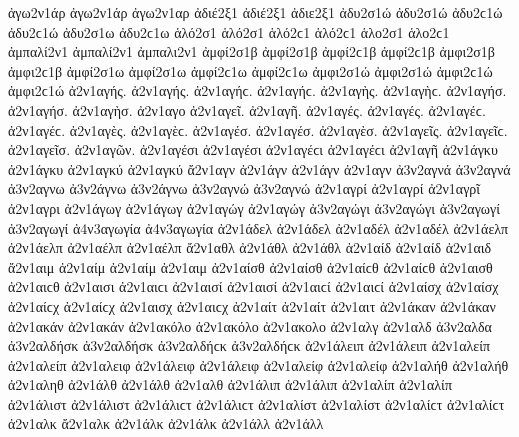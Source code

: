 {%
%
ἀγω2ν1άρ ἀγω2ν1άρ   %
ἀγω2ν1αρ 
ἀδιέ2ξ1 ἀδιέ2ξ1   %
ἀδιε2ξ1 
ἀδυ2σ1ώ ἀδυ2σ1ώ ἀδυ2ϲ1ώ ἀδυ2ϲ1ώ   %
ἀδυ2σ1ω ἀδυ2ϲ1ω 
ἁλό2σ1 ἁλό2σ1 ἁλό2ϲ1 ἁλό2ϲ1   %
ἁλο2σ1 ἁλο2ϲ1 
ἀμπαλί2ν1 ἀμπαλί2ν1   %
ἀμπαλι2ν1 
ἀμφί2σ1β ἀμφί2σ1β ἀμφί2ϲ1β ἀμφί2ϲ1β   %
ἀμφι2σ1β ἀμφι2ϲ1β 
ἀμφί2σ1ω ἀμφί2σ1ω ἀμφί2ϲ1ω ἀμφί2ϲ1ω   %
ἀμφι2σ1ώ ἀμφι2σ1ώ ἀμφι2ϲ1ώ ἀμφι2ϲ1ώ 
ἀ2ν1αγής. ἀ2ν1αγής. ἀ2ν1αγήϲ. ἀ2ν1αγήϲ.   %
ἀ2ν1αγὴς. ἀ2ν1αγὴϲ. 
ἀ2ν1αγήσ. ἀ2ν1αγήσ. 
ἀ2ν1αγὴσ. 
ἀ2ν1αγο 
ἀ2ν1αγεῖ. 
ἀ2ν1αγῆ. 
ἀ2ν1αγές. ἀ2ν1αγές. ἀ2ν1αγέϲ. ἀ2ν1αγέϲ. 
ἀ2ν1αγὲς. ἀ2ν1αγὲϲ. 
ἀ2ν1αγέσ. ἀ2ν1αγέσ. 
ἀ2ν1αγὲσ. 
ἀ2ν1αγεῖς. ἀ2ν1αγεῖϲ. 
ἀ2ν1αγεῖσ. 
ἀ2ν1αγῶν. 
ἀ2ν1αγέσι ἀ2ν1αγέσι ἀ2ν1αγέϲι ἀ2ν1αγέϲι 
ἀ2ν1αγῆ 
ἀ2ν1άγκυ ἀ2ν1άγκυ   %
ἀ2ν1αγκύ ἀ2ν1αγκύ 
ἄ2ν1αγν   %
ἀ2ν1άγν ἀ2ν1άγν 
ἀ2ν1αγν   %
ἀ3ν2αγνά ἀ3ν2αγνά   %
ἀ3ν2αγνω   %
ἀ3ν2άγνω ἀ3ν2άγνω   %
ἀ3ν2αγνώ ἀ3ν2αγνώ 
ἀ2ν1αγρί ἀ2ν1αγρί   %
ἀ2ν1αγρῖ   %
ἀ2ν1αγρι   %
ἀ2ν1άγωγ ἀ2ν1άγωγ   %
ἀ2ν1αγώγ ἀ2ν1αγώγ 
ἀ3ν2αγώγι ἀ3ν2αγώγι   %
ἀ3ν2αγωγί ἀ3ν2αγωγί 
ἀ4ν3αγωγία ἀ4ν3αγωγία   %
ἀ2ν1άδελ ἀ2ν1άδελ   %
ἀ2ν1αδέλ ἀ2ν1αδέλ 
ἀ2ν1άελπ ἀ2ν1άελπ   %
ἀ2ν1αέλπ ἀ2ν1αέλπ 
ἄ2ν1αθλ   %
ἀ2ν1άθλ ἀ2ν1άθλ 
ἀ2ν1αίδ ἀ2ν1αίδ   %
ἀ2ν1αιδ   %
ἄ2ν1αιμ   %
ἀ2ν1αίμ ἀ2ν1αίμ 
ἀ2ν1αιμ   %
ἀ2ν1αίσθ ἀ2ν1αίσθ ἀ2ν1αίϲθ ἀ2ν1αίϲθ   %
ἀ2ν1αισθ ἀ2ν1αιϲθ 
ἀ2ν1αισι ἀ2ν1αιϲι   %
ἀ2ν1αισί ἀ2ν1αισί ἀ2ν1αιϲί ἀ2ν1αιϲί 
ἀ2ν1αίσχ ἀ2ν1αίσχ ἀ2ν1αίϲχ ἀ2ν1αίϲχ   %
ἀ2ν1αισχ ἀ2ν1αιϲχ 
ἀ2ν1αίτ ἀ2ν1αίτ   %
ἀ2ν1αιτ 
ἀ2ν1άκαν ἀ2ν1άκαν   %
ἀ2ν1ακάν ἀ2ν1ακάν 
ἀ2ν1ακόλο ἀ2ν1ακόλο   %
ἀ2ν1ακολο 
ἀ2ν1αλγ   %
ἀ2ν1αλδ   %
ἀ3ν2αλδα   %
ἀ3ν2αλδήσκ ἀ3ν2αλδήσκ ἀ3ν2αλδήϲκ ἀ3ν2αλδήϲκ   %
ἀ2ν1άλειπ ἀ2ν1άλειπ   %
ἀ2ν1αλείπ ἀ2ν1αλείπ 
ἀ2ν1αλειφ   %
ἀ2ν1άλειφ ἀ2ν1άλειφ   %
ἀ2ν1αλείφ ἀ2ν1αλείφ 
ἀ2ν1αλήθ ἀ2ν1αλήθ   %
ἀ2ν1αληθ 
ἀ2ν1άλθ ἀ2ν1άλθ   %
ἀ2ν1αλθ 
ἀ2ν1άλιπ ἀ2ν1άλιπ   %
ἀ2ν1αλίπ ἀ2ν1αλίπ 
ἀ2ν1άλιστ ἀ2ν1άλιστ ἀ2ν1άλιϲτ ἀ2ν1άλιϲτ   %
ἀ2ν1αλίστ ἀ2ν1αλίστ ἀ2ν1αλίϲτ ἀ2ν1αλίϲτ 
ἀ2ν1αλκ   %
ἄ2ν1αλκ   %
ἀ2ν1άλκ ἀ2ν1άλκ 
ἀ2ν1άλλ ἀ2ν1άλλ   %
}
